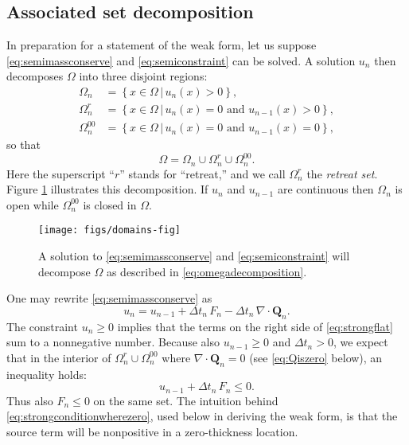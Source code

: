 \documentclass[final,onefignum]{siamart190516}
\newcommand\bQ{\mathbf{Q}}
\newcommand{\Div}{\nabla\cdot}
\begin{document}
\subsection{Associated set decomposition}  \label{subsec:setdecompose}  In preparation for a statement of the weak form, let us suppose \eqref{eq:semimassconserve} and \eqref{eq:semiconstraint} can be solved.  A solution $u_n$ then decomposes $\Omega$ into three disjoint regions:
\begin{align*}
\Omega_n &= \left\{x \in \Omega \,\big|\, u_n(x)>0\right\}, \\
\Omega_n^r &= \left\{x \in \Omega \,\big|\, u_n(x)=0 \text{ and } u_{n-1}(x) > 0\right\}, \\
\Omega_n^{00} &= \left\{x \in \Omega \,\big|\, u_n(x)=0 \text{ and } u_{n-1}(x) = 0\right\},
\end{align*}
so that
\begin{equation}
\Omega = \Omega_n \cup \Omega_n^r \cup \Omega_n^{00}.  \label{eq:omegadecomposition}
\end{equation}
Here the superscript ``$r$'' stands for ``retreat,'' and we call $\Omega_n^r$ the \emph{retreat set}.  Figure \ref{fig:domains} illustrates this decomposition.  If $u_n$ and $u_{n-1}$ are continuous then $\Omega_n$ is open while $\Omega_n^{00}$ is closed in $\Omega$.

\begin{figure}[ht]
\medskip
\begin{center}
\texttt{[image: figs/domains-fig]}
\end{center}
\caption{A solution to \eqref{eq:semimassconserve} and \eqref{eq:semiconstraint} will decompose $\Omega$ as described in \eqref{eq:omegadecomposition}.}
\label{fig:domains}
\end{figure}

One may rewrite \eqref{eq:semimassconserve} as
\begin{equation}
u_n = u_{n-1} + \Delta t_n\, F_n - \Delta t_n\, \Div \bQ_n.  \label{eq:strongflat}
\end{equation}
The constraint $u_n \ge 0$ implies that the terms on the right side of \eqref{eq:strongflat} sum to a nonnegative number.  Because also $u_{n-1}\ge 0$ and $\Delta t_n > 0$, we expect that in the interior of $\Omega_n^r \cup \Omega_n^{00}$ where $\Div \bQ_n=0$ (see \eqref{eq:Qiszero} below), an inequality holds:
\begin{equation}
u_{n-1} + \Delta t_n\, F_n \le 0. \label{eq:strongconditionwherezero}
\end{equation}
Thus also $F_n \le 0$ on the same set.  The intuition behind \eqref{eq:strongconditionwherezero}, used below in deriving the weak form, is that the source term will be nonpositive in a zero-thickness location.
\end{document}

